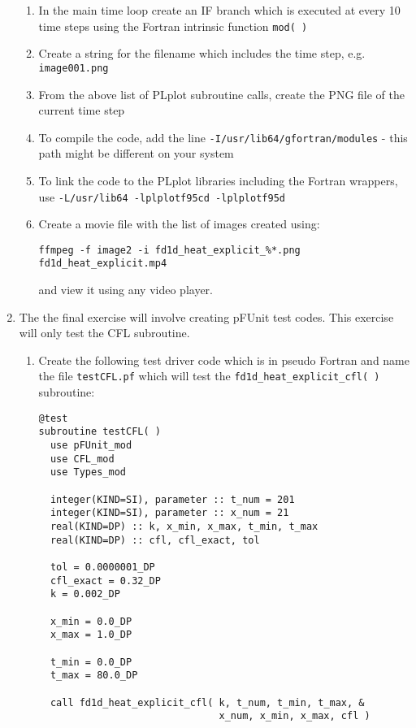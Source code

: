 \documentclass[12pt]{article}
\begin{document}
\begin{enumerate}
\begin{itemize}
\end{itemize}  
\begin{enumerate}
\item In the main time loop create an IF branch which is executed at every 10 time steps
using the Fortran intrinsic function \texttt{mod( )}
\item Create a string for the filename which includes the time step, e.g. 
\texttt{image001.png}
\item From the above list of PLplot subroutine calls, create the PNG file of the
current time step
\item To compile the code, add the line \texttt{-I/usr/lib64/gfortran/modules} - this
  path might be different on your system
\item To link the code to the PLplot libraries including the Fortran wrappers, use \newline
\texttt{-L/usr/lib64 -lplplotf95cd -lplplotf95d}
\item Create a movie file with the list of images created using:
\begin{verbatim}
ffmpeg -f image2 -i fd1d_heat_explicit_%*.png fd1d_heat_explicit.mp4
\end{verbatim}
and view it using any video player. 
\end{enumerate}
\item The the final exercise will involve creating pFUnit test codes. This exercise will only
test the CFL subroutine. 
\begin{enumerate}
\item Create the following test driver code which is in pseudo Fortran and name the file \texttt{testCFL.pf} 
which will test the \texttt{fd1d\_heat\_explicit\_cfl( )} subroutine:
\begin{verbatim}
@test
subroutine testCFL( )
  use pFUnit_mod
  use CFL_mod
  use Types_mod

  integer(KIND=SI), parameter :: t_num = 201
  integer(KIND=SI), parameter :: x_num = 21
  real(KIND=DP) :: k, x_min, x_max, t_min, t_max 
  real(KIND=DP) :: cfl, cfl_exact, tol

  tol = 0.0000001_DP
  cfl_exact = 0.32_DP
  k = 0.002_DP

  x_min = 0.0_DP
  x_max = 1.0_DP

  t_min = 0.0_DP
  t_max = 80.0_DP
  
  call fd1d_heat_explicit_cfl( k, t_num, t_min, t_max, &
                               x_num, x_min, x_max, cfl )


\end{verbatim}
\end{enumerate}
\end{enumerate}
\end{document}
